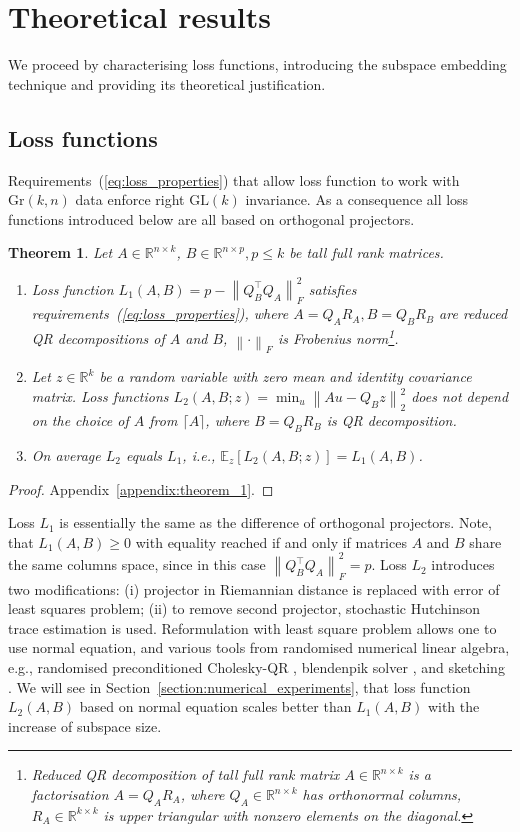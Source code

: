 \documentclass{article}
\newtheorem{theorem}{Theorem}
\begin{document}
\section{Theoretical results}
\label{section:theoretical results}
We proceed by characterising loss functions, introducing the subspace embedding technique and providing its theoretical justification.
\subsection{Loss functions}
Requirements~(\ref{eq:loss_properties}) that allow loss function to work with $\text{Gr}(k, n)$ data enforce right $\text{GL}(k)$ invariance. As a consequence all loss functions introduced below are all based on orthogonal projectors.
\begin{theorem}
	\label{th:loss_functions}
	Let $A\in \mathbb{R}^{n\times k}$, $B \in \mathbb{R}^{n\times p}, p\leq k$ be tall full rank matrices.
	\begin{enumerate}
		\item Loss function $L_1(A, B) = p - \left\| Q_{B}^\top Q_{A}\right\|_{F}^2$ satisfies requirements~(\ref{eq:loss_properties}), where $A = Q_{A}R_{A}, B = Q_{B}R_{B}$ are reduced QR decompositions of $A$ and $B$, $\left\|\cdot\right\|_{F}$ is Frobenius norm\footnote{Reduced QR decomposition of tall full rank matrix $A\in \mathbb{R}^{n\times k}$ is a factorisation $A = Q_{A} R_{A}$, where $Q_{A}\in\mathbb{R}^{n\times k}$ has orthonormal columns, $R_{A}\in\mathbb{R}^{k\times k}$ is upper triangular with nonzero elements on the diagonal.}.
		\item Let $z\in\mathbb{R}^{k}$ be a random variable with zero mean and identity covariance matrix. Loss functions $L_2(A, B; z) = \min_{u}\left\|A u - Q_{B} z\right\|_2^2$ does not depend on the choice of $A$ from $\lceil A\rceil$, where $B = Q_{B}R_{B}$ is QR decomposition. 
		\item On average $L_2$ equals $L_1$, i.e., $\mathbb{E}_{z}\left[ L_2(A, B; z)\right] = L_1(A, B)$.
	\end{enumerate}
\end{theorem}
\begin{proof}Appendix~\ref{appendix:theorem_1}.
\end{proof}
Loss $L_1$ is essentially the same as the difference of orthogonal projectors. Note, that $L_1(A, B)\geq 0$ with equality reached if and only if matrices $A$ and $B$ share the same columns space, since in this case $\left\| Q_{B}^\top Q_{A}\right\|_{F}^2 = p$. Loss $L_2$ introduces two modifications: (i) projector in Riemannian distance is replaced with error of least squares problem; (ii) to remove second projector, stochastic Hutchinson trace estimation is used. Reformulation with least square problem allows one to use normal equation, and various tools from randomised numerical linear algebra, e.g., randomised preconditioned Cholesky-QR \cite{garrison2024randomized}, blendenpik solver \cite{avron2010blendenpik}, and sketching \cite{woodruff2014sketching}. We will see in Section~\ref{section:numerical_experiments}, that loss function $L_2(A, B)$ based on normal equation scales better than $L_1(A, B)$ with the increase of subspace size.
\end{document}
